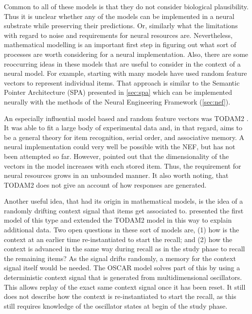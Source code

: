 Common to all of these models is that they do not consider biological plausibility.
Thus it is unclear whether any of the models can be implemented in a neural substrate while preserving their predictions.
Or, similarly what the limitations with regard to noise and requirements for neural resources are.
Nevertheless, mathematical modelling is an important first step in figuring out what sort of processes are worth considering for a neural implementation.
Also, there are some reoccurring ideas in these models that are useful to consider in the context of a neural model.
For example, starting with \textcite{Anderson1973} many models have used random feature vectors to represent individual items.
That approach is similar to the Semantic Pointer Architecture (SPA) presented in \cref{sec:spa} which can be implemented neurally with the methods of the Neural Engineering Framework (\cref{sec:nef}).

An especially influential model based and random feature vectors was \mbox{TODAM2} \parencite{Murdock1993}.
It was able to fit a large body of experimental data and, in that regard, aims to be a general theory for item recognition, serial order, and associative memory.
A neural implementation could very well be possible with the NEF, but has not been attempted so far.
However, \textcite{Choo2010} pointed out that the dimensionality of the vectors in the model increases with each stored item.
Thus, the requirement for neural resources grows in an unbounded manner.
It also worth noting, that \mbox{TODAM2} does not give an account of how responses are generated.

Another useful idea, that had its origin in mathematical models, is the idea of a randomly drifting context signal that items get associated to.
\Textcite{Estes1955} presented the first model of this type and \textcite{Murdock1997} extended the \mbox{TODAM2} model in this way to explain additional data.
Two open questions in these sort of models are, (1) how is the context at an earlier time re-instantiated to start the recall;
and (2) how the context is advanced in the same way during recall as in the study phase to recall the remaining items?
As the signal drifts randomly, a memory for the context signal itself would be needed.
The OSCAR model \parencite{Brown2000} solves part of this by using a deterministic context signal that is generated from multidimensional oscillators.
This allows replay of the exact same context signal once it has been reset.
It still does not describe how the context is re-instantiated to start the recall, as this still requires knowledge of the oscillator states at begin of the study phase.

